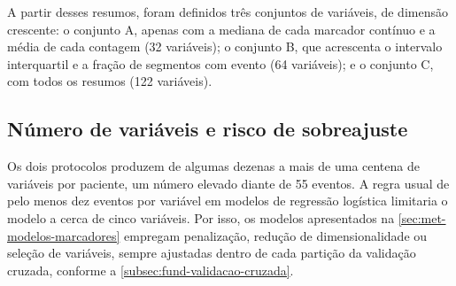 A partir desses resumos, foram definidos três conjuntos de variáveis, de
dimensão crescente: o conjunto A, apenas com a mediana de cada marcador
contínuo e a média de cada contagem (32 variáveis); o conjunto B, que
acrescenta o intervalo interquartil e a fração de segmentos com evento
(64 variáveis); e o conjunto C, com todos os resumos (122 variáveis).

\subsection{Número de variáveis e risco de sobreajuste}
\label{subsec:met-numero-variaveis}

Os dois protocolos produzem de algumas dezenas a mais de uma centena de
variáveis por paciente, um número elevado diante de 55 eventos. A regra
usual de pelo menos dez eventos por variável em modelos de regressão
logística \cite{peduzzi1996simulation} limitaria o modelo a cerca de cinco
variáveis. Por isso, os modelos apresentados na
\autoref{sec:met-modelos-marcadores} empregam penalização, redução de
dimensionalidade ou seleção de variáveis, sempre ajustadas dentro de cada
partição da validação cruzada, conforme a
\autoref{subsec:fund-validacao-cruzada}.





